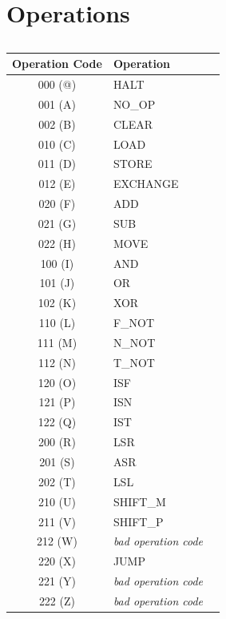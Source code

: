 \documentclass[12pt]{article}
\begin{document}
\section{Operations} \label{sec:Operations}

\begin{table}[h!]
    \centering
    \caption{}
    \label{tab:Opcodes}
    \begin{tabular}{|c|l|c|} 
        \hline
        \textbf{Operation Code} & Operation \\ \hline

        000 (@) & HALT \\ \hline
        001 (A) & NO\_OP \\ \hline
        002 (B) & CLEAR \\ \hline

        010 (C) & LOAD \\ \hline
        011 (D) & STORE \\ \hline
        012 (E) & EXCHANGE \\ \hline

        020 (F) & ADD \\ \hline
        021 (G) & SUB \\ \hline
        022 (H) & MOVE \\ \hline

        100 (I) & AND \\ \hline
        101 (J) & OR \\ \hline
        102 (K) & XOR \\ \hline

        110 (L) & F\_NOT \\ \hline
        111 (M) & N\_NOT \\ \hline
        112 (N) & T\_NOT \\ \hline

        120 (O) & ISF \\ \hline
        121 (P) & ISN \\ \hline
        122 (Q) & IST \\ \hline

        200 (R) & LSR \\ \hline
        201 (S) & ASR \\ \hline
        202 (T) & LSL \\ \hline

        210 (U) & SHIFT\_M \\ \hline
        211 (V) & SHIFT\_P \\ \hline
        212 (W) & \textit{bad operation code} \\ \hline

        220 (X) & JUMP \\ \hline
        221 (Y) & \textit{bad operation code} \\ \hline
        222 (Z) & \textit{bad operation code} \\ \hline
    \end{tabular}
\end{table}
\end{document}
